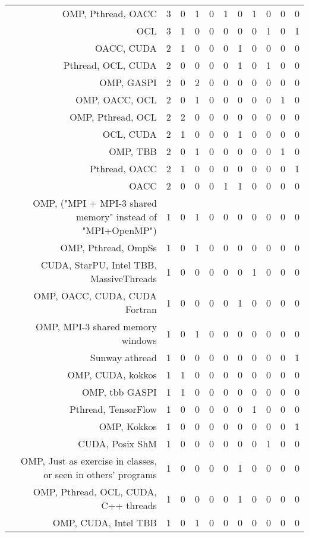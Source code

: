 {\begin{landscape}
\begin{longtable}[htb]{r|c|c|c|c|c|c|c|c|c|c}
{OMP, Pthread, OACC} & 3 & 0 & 1 & 0 & 1 & 0 & 1 & 0 & 0 & 0 \\%
{OCL} & 3 & 1 & 0 & 0 & 0 & 0 & 0 & 1 & 0 & 1 \\%
{OACC, CUDA} & 2 & 1 & 0 & 0 & 0 & 1 & 0 & 0 & 0 & 0 \\%
{Pthread, OCL, CUDA} & 2 & 0 & 0 & 0 & 0 & 1 & 0 & 1 & 0 & 0 \\%
{OMP, GASPI} & 2 & 0 & 2 & 0 & 0 & 0 & 0 & 0 & 0 & 0 \\%
{OMP, OACC, OCL} & 2 & 0 & 1 & 0 & 0 & 0 & 0 & 0 & 1 & 0 \\%
{OMP, Pthread, OCL} & 2 & 2 & 0 & 0 & 0 & 0 & 0 & 0 & 0 & 0 \\%
{OCL, CUDA} & 2 & 1 & 0 & 0 & 0 & 1 & 0 & 0 & 0 & 0 \\%
{OMP, TBB} & 2 & 0 & 1 & 0 & 0 & 0 & 0 & 0 & 1 & 0 \\%
{Pthread, OACC} & 2 & 1 & 0 & 0 & 0 & 0 & 0 & 0 & 0 & 1 \\%
{OACC} & 2 & 0 & 0 & 0 & 1 & 1 & 0 & 0 & 0 & 0 \\%
{OMP, ("MPI + MPI-3 shared memory" instead of "MPI+OpenMP")} & 1 & 0 & 1 & 0 & 0 & 0 & 0 & 0 & 0 & 0 \\%
{OMP, Pthread, OmpSs} & 1 & 0 & 1 & 0 & 0 & 0 & 0 & 0 & 0 & 0 \\%
{CUDA, StarPU, Intel TBB, MassiveThreads} & 1 & 0 & 0 & 0 & 0 & 0 & 1 & 0 & 0 & 0 \\%
{OMP, OACC, CUDA, CUDA Fortran} & 1 & 0 & 0 & 0 & 0 & 1 & 0 & 0 & 0 & 0 \\%
{OMP, MPI-3 shared memory windows} & 1 & 0 & 1 & 0 & 0 & 0 & 0 & 0 & 0 & 0 \\%
{Sunway athread} & 1 & 0 & 0 & 0 & 0 & 0 & 0 & 0 & 0 & 1 \\%
{OMP, CUDA, kokkos} & 1 & 1 & 0 & 0 & 0 & 0 & 0 & 0 & 0 & 0 \\%
{OMP, tbb GASPI} & 1 & 1 & 0 & 0 & 0 & 0 & 0 & 0 & 0 & 0 \\%
{Pthread, TensorFlow} & 1 & 0 & 0 & 0 & 0 & 0 & 1 & 0 & 0 & 0 \\%
{OMP, Kokkos} & 1 & 0 & 0 & 0 & 0 & 0 & 0 & 0 & 0 & 1 \\%
{CUDA, Posix ShM} & 1 & 0 & 0 & 0 & 0 & 0 & 0 & 1 & 0 & 0 \\%
{OMP, Just as exercise in classes, or seen in others' programs} & 1 & 0 & 0 & 0 & 0 & 1 & 0 & 0 & 0 & 0 \\%
{OMP, Pthread, OCL, CUDA, C++ threads} & 1 & 0 & 0 & 0 & 0 & 1 & 0 & 0 & 0 & 0 \\%
{OMP, CUDA, Intel TBB} & 1 & 0 & 1 & 0 & 0 & 0 & 0 & 0 & 0 & 0 \\%

\end{longtable}
\end{landscape}}

